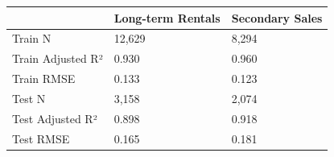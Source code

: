\begin{tabular}{lll}
\toprule
 & Long-term Rentals & Secondary Sales \\
\midrule
Train N & 12,629 & 8,294 \\
Train Adjusted R² & 0.930 & 0.960 \\
Train RMSE & 0.133 & 0.123 \\
Test N & 3,158 & 2,074 \\
Test Adjusted R² & 0.898 & 0.918 \\
Test RMSE & 0.165 & 0.181 \\
\bottomrule
\end{tabular}
